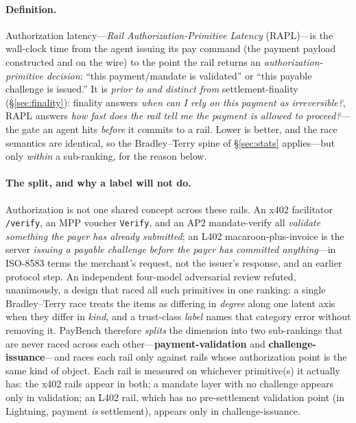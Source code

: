\documentclass[11pt]{article}
\begin{document}
\paragraph{Definition.} Authorization latency---\emph{Rail Authorization-Primitive Latency}
(RAPL)---is the wall-clock time from the agent issuing its pay command (the payment payload constructed
and on the wire) to the point the rail returns an \emph{authorization-primitive decision}: ``this
payment/mandate is validated'' or ``this payable challenge is issued.'' It is \emph{prior to and
distinct from} settlement-finality (\S\ref{sec:finality}): finality answers \emph{when can I rely on
this payment as irreversible?}, RAPL answers \emph{how fast does the rail tell me the payment is allowed
to proceed?}---the gate an agent hits \emph{before} it commits to a rail. Lower is better, and the race
semantics are identical, so the Bradley--Terry spine of \S\ref{sec:stats} applies---but only
\emph{within} a sub-ranking, for the reason below.

\paragraph{The split, and why a label will not do.} Authorization is not one shared concept across
these rails. An x402 facilitator \texttt{/verify}, an MPP voucher \texttt{Verify}, and an AP2
mandate-verify all \emph{validate something the payer has already submitted}; an L402
macaroon-plus-invoice is the server \emph{issuing a payable challenge before the payer has committed
anything}---in ISO-8583 terms the merchant's request, not the issuer's response, and an earlier
protocol step. An independent four-model adversarial review refuted, unanimously, a design that raced
all such primitives in one ranking: a single Bradley--Terry race treats the items as differing in
\emph{degree} along one latent axis when they differ in \emph{kind}, and a trust-class \emph{label}
names that category error without removing it. PayBench therefore \emph{splits} the dimension into two
sub-rankings that are never raced across each other---\textbf{payment-validation} and
\textbf{challenge-issuance}---and races each rail only against rails whose authorization point is the
same kind of object. Each rail is measured on whichever primitive(s) it actually has: the x402 rails
appear in both; a mandate layer with no challenge appears only in validation; an L402 rail, which has
no pre-settlement validation point (in Lightning, payment \emph{is} settlement), appears only in
challenge-issuance.
\end{document}

